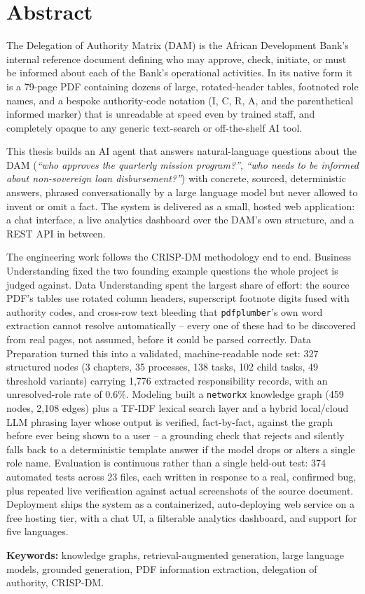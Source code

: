 \chapter*{Abstract}

The Delegation of Authority Matrix (DAM) is the African Development Bank's internal reference document defining who may approve, check, initiate, or must be informed about each of the Bank's operational activities. In its native form it is a 79-page PDF containing dozens of large, rotated-header tables, footnoted role names, and a bespoke authority-code notation (I, C, R, A, and the parenthetical informed marker) that is unreadable at speed even by trained staff, and completely opaque to any generic text-search or off-the-shelf AI tool.

This thesis builds an AI agent that answers natural-language questions about the DAM (\textit{``who approves the quarterly mission program?''}, \textit{``who needs to be informed about non-sovereign loan disbursement?''}) with concrete, sourced, deterministic answers, phrased conversationally by a large language model but never allowed to invent or omit a fact. The system is delivered as a small, hosted web application: a chat interface, a live analytics dashboard over the DAM's own structure, and a REST API in between.

The engineering work follows the CRISP-DM methodology end to end. Business Understanding fixed the two founding example questions the whole project is judged against. Data Understanding spent the largest share of effort: the source PDF's tables use rotated column headers, superscript footnote digits fused with authority codes, and cross-row text bleeding that \texttt{pdfplumber}'s own word extraction cannot resolve automatically -- every one of these had to be discovered from real pages, not assumed, before it could be parsed correctly. Data Preparation turned this into a validated, machine-readable node set: 327 structured nodes (3 chapters, 35 processes, 138 tasks, 102 child tasks, 49 threshold variants) carrying 1,776 extracted responsibility records, with an unresolved-role rate of 0.6\%. Modeling built a \texttt{networkx} knowledge graph (459 nodes, 2,108 edges) plus a TF-IDF lexical search layer and a hybrid local/cloud LLM phrasing layer whose output is verified, fact-by-fact, against the graph before ever being shown to a user -- a grounding check that rejects and silently falls back to a deterministic template answer if the model drops or alters a single role name. Evaluation is continuous rather than a single held-out test: 374 automated tests across 23 files, each written in response to a real, confirmed bug, plus repeated live verification against actual screenshots of the source document. Deployment ships the system as a containerized, auto-deploying web service on a free hosting tier, with a chat UI, a filterable analytics dashboard, and support for five languages.

\vspace{0.6cm}
\noindent\textbf{Keywords:} knowledge graphs, retrieval-augmented generation, large language models, grounded generation, PDF information extraction, delegation of authority, CRISP-DM.

\newpage
\thispagestyle{empty}
\mbox{}
